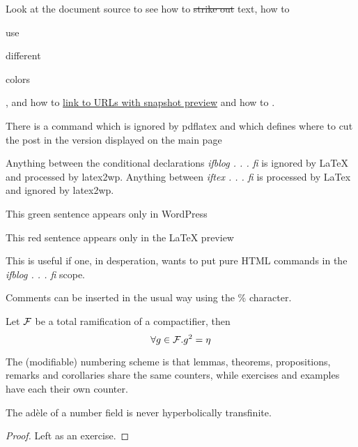 \documentclass[12pt]{article}
\begin{document}
Look at the document source to see how to \sout{strike out} text, how
to \begin{red}use\end{red} \begin{green}different\end{green} \begin{blue}colors\end{blue},
and how to \href{http://www.google.com}{link to URLs with snapshot preview}
and how to .


There is a command which is ignored by pdflatex and which 
defines where to cut the post in the version displayed on the
main page\more

Anything between the conditional declarations {\em ifblog . . . fi}
is ignored by LaTeX and processed by latex2wp. Anything
between {\em iftex . . . fi} is processed by LaTex and ignored
by latex2wp.

\ifblog \begin{green}This green sentence appears only in WordPress \end{green} \fi

\iftex \begin{red}This red sentence appears only in the LaTeX preview \end{red} \fi

This is useful if one, in desperation, wants to put pure HTML commands
in the {\em ifblog . . . fi} scope.

Comments can be inserted in the usual way using the \% character.%


\begin{lemma}[Main] \label{lm:main}
Let $\cal F$ be a total ramification of a compactifier, then
\begin{equation} \label{eq:lemma} \forall g \in {\cal F}. g^2 = \eta \end{equation}
\end{lemma}

The  (modifiable) numbering scheme is that lemmas, theorems, 
propositions, remarks and corollaries share the same counters,
while exercises and examples have each their own counter.

\begin{theorem} \label{th:ad} The ad\`ele of a number field is never
hyperbolically transfinite.
\end{theorem}

\begin{proof} Left as an exercise. \end{proof}
\end{document}
